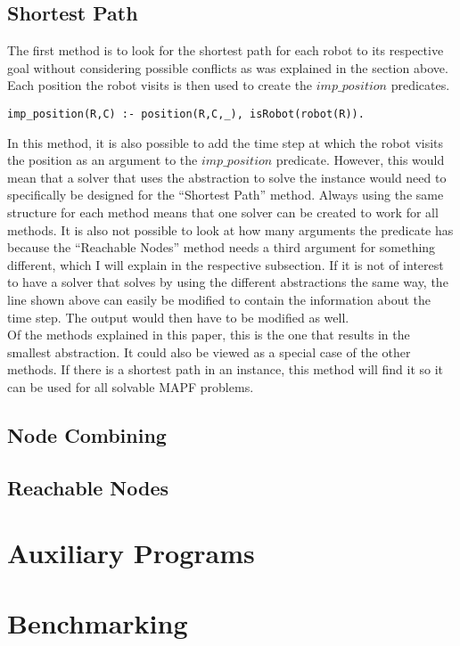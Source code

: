 \documentclass[runningheads]{llncs}
\begin{document}
\subsection{Shortest Path}
The first method is to look for the shortest path for each robot to its respective goal without considering possible conflicts as was explained in the section above. Each position the robot visits is then used to create the $imp\_position$ predicates. 
\begin{verbatim}
imp_position(R,C) :- position(R,C,_), isRobot(robot(R)).
\end{verbatim}
In this method, it is also possible to add the time step at which the robot visits the position as an argument to the $imp\_position$ predicate. However, this would mean that a solver that uses the abstraction to solve the instance would need to specifically
be designed for the ``Shortest Path'' method. Always using the same structure for each method means that one solver can be created to work for all methods. It is also not possible to look at how many arguments the predicate has because the 
``Reachable Nodes'' method needs a third argument for something different, which I will explain in the respective subsection. If it is not of interest to have a solver that solves by using the different abstractions the same way, the line shown above can 
easily be modified to contain the information about the time step. The output would then have to be modified as well. \\
Of the methods explained in this paper, this is the one that results in the smallest abstraction. It could also be viewed as a special case of the other methods. If there is a shortest path in an instance, this method will find it so it can be used for all solvable
MAPF problems.
\subsection{Node Combining}
\subsection{Reachable Nodes}

\section{Auxiliary Programs}

\section{Benchmarking}
\end{document}
